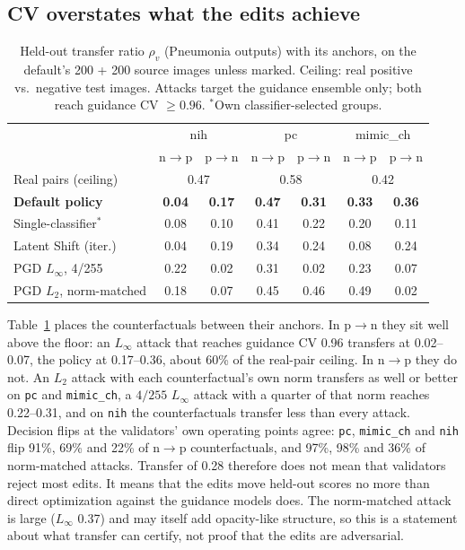 \subsection{CV overstates what the edits achieve}
\label{sec:cv-overstates}

\begin{table}[t]
\centering
\caption{Held-out transfer ratio $\rho_v$ (Pneumonia outputs) with its anchors, on the default's 200 + 200 source images unless marked. Ceiling: real positive vs.\ negative test images. Attacks target the guidance ensemble only; both reach guidance CV $\geq 0.96$. $^*$Own classifier-selected groups.}
\label{tab:transfer-ratio}
\small
\setlength{\tabcolsep}{3.2pt}
\begin{tabular}{@{}lcccccc@{}}
\toprule
& \multicolumn{2}{c}{nih} & \multicolumn{2}{c}{pc} & \multicolumn{2}{c}{mimic\_ch} \\
& n$\to$p & p$\to$n & n$\to$p & p$\to$n & n$\to$p & p$\to$n \\
\midrule
Real pairs (ceiling) & \multicolumn{2}{c}{0.47} & \multicolumn{2}{c}{0.58} & \multicolumn{2}{c}{0.42} \\
\textbf{Default policy} & \textbf{0.04} & \textbf{0.17} & \textbf{0.47} & \textbf{0.31} & \textbf{0.33} & \textbf{0.36} \\
Single-classifier$^*$ & 0.08 & 0.10 & 0.41 & 0.22 & 0.20 & 0.11 \\
Latent Shift (iter.) & 0.04 & 0.19 & 0.34 & 0.24 & 0.08 & 0.24 \\
PGD $L_\infty$, 4/255 & 0.22 & 0.02 & 0.31 & 0.02 & 0.23 & 0.07 \\
PGD $L_2$, norm-matched & 0.18 & 0.07 & 0.45 & 0.46 & 0.49 & 0.02 \\
\bottomrule
\end{tabular}
\end{table}

Table~\ref{tab:transfer-ratio} places the counterfactuals between their anchors. In p$\to$n they sit well above the floor: an $L_\infty$ attack that reaches guidance CV 0.96 transfers at 0.02--0.07, the policy at 0.17--0.36, about 60\% of the real-pair ceiling. In n$\to$p they do not. An $L_2$ attack with each counterfactual's own norm transfers as well or better on \texttt{pc} and \texttt{mimic\_ch}, a $4/255$ $L_\infty$ attack with a quarter of that norm reaches 0.22--0.31, and on \texttt{nih} the counterfactuals transfer less than every attack. Decision flips at the validators' own operating points agree: \texttt{pc}, \texttt{mimic\_ch} and \texttt{nih} flip 91\%, 69\% and 22\% of n$\to$p counterfactuals, and 97\%, 98\% and 36\% of norm-matched attacks. Transfer of 0.28 therefore does not mean that validators reject most edits. It means that the edits move held-out scores no more than direct optimization against the guidance models does. The norm-matched attack is large ($L_\infty$ 0.37) and may itself add opacity-like structure, so this is a statement about what transfer can certify, not proof that the edits are adversarial.

